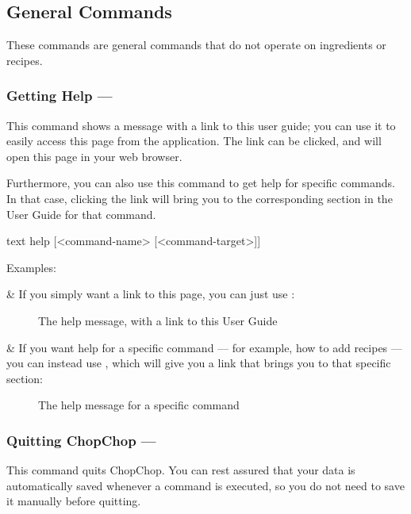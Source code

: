 
\pagebreak
\hypertarget{GroupGeneralCommands}{}
\subsection{General Commands}

These commands are general commands that do not operate on ingredients or recipes.

\hypertarget{HelpCommand}{}
\subsubsection{Getting Help — \texttt{}}

	This command shows a message with a link to this user guide; you can use it to easily access this page from the application.
	The link can be clicked, and will open this page in your web browser.

	Furthermore, you can also use this command to get help for specific commands. In that case, clicking the link will bring you
	to the corresponding section in the User Guide for that command.

	 \begin{blockofcode}{text}
		help [<command-name> [<command-target>]]
	\end{blockofcode}

	Examples:
	\begin{numberedlist}
	& If you simply want a link to this page, you can just use :
		\begin{figure}[!htbp]\centering\ContinuedFloat*
			\caption{The help message, with a link to this User Guide}
		\end{figure}

	& If you want help for a specific command --- for example, how to add recipes --- you can instead use ,
		which will give you a link that brings you to that specific section:
		\begin{figure}[!htbp]\centering\ContinuedFloat
			\caption{The help message for a specific command}
		\end{figure}

	\end{numberedlist}



\hypertarget{QuitCommand}{}
\subsubsection{Quitting ChopChop — \texttt{}}
	This command quits ChopChop. You can rest assured that your data is automatically saved whenever a command is executed, so you
	do not need to save it manually before quitting.

